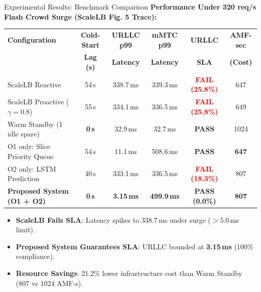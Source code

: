 \documentclass[aspectratio=169,10pt]{beamer}
\begin{document}
\begin{frame}{Experimental Results: Benchmark Comparison}
    \textbf{Performance Under 320 req/s Flash Crowd Surge (ScaleLB Fig. 5 Trace):}
    \vspace{0.2cm}
    
    \begin{table}[H]
    \centering
    \footnotesize
    \begin{tabular}{lccccc}
    \toprule
    \textbf{Configuration} & \textbf{Cold-Start} & \textbf{URLLC p99} & \textbf{mMTC p99} & \textbf{URLLC} & \textbf{AMF-sec} \\
     & \textbf{Lag (s)} & \textbf{Latency} & \textbf{Latency} & \textbf{SLA} & \textbf{(Cost)} \\
    \midrule
    ScaleLB Reactive \cite{scalelb} & 54\,s & 338.7\,ms & 339.3\,ms & \textcolor{red}{\textbf{FAIL (25.8\%)}} & 647 \\
    ScaleLB Proactive ($\gamma=0.8$) & 55\,s & 334.1\,ms & 336.5\,ms & \textcolor{red}{\textbf{FAIL (25.8\%)}} & 649 \\
    Warm Standby (1 idle spare) & \textbf{0\,s} & 32.9\,ms & 32.7\,ms & \textcolor{green!60!black}{\textbf{PASS}} & 1024 \\
    O1 only: Slice Priority Queue & 54\,s & 11.1\,ms & 508.6\,ms & \textcolor{green!60!black}{\textbf{PASS}} & \textbf{647} \\
    O2 only: LSTM Prediction & 40\,s & 333.1\,ms & 336.5\,ms & \textcolor{red}{\textbf{FAIL (18.3\%)}} & 807 \\
    \textbf{Proposed System (O1 + O2)} & \textbf{0\,s} & \textbf{3.15\,ms} & \textbf{499.9\,ms} & \textcolor{green!60!black}{\textbf{PASS (0.0\%)}} & \textbf{807} \\
    \bottomrule
    \end{tabular}
    \end{table}

    \vspace{0.2cm}
    \begin{itemize}
        \item \textbf{ScaleLB Fails SLA}: Latency spikes to 338.7\,ms under surge ($>5.0$\,ms limit).
        \item \textbf{Proposed System Guarantees SLA}: URLLC bounded at \textbf{3.15\,ms} (100\% compliance).
        \item \textbf{Resource Savings}: 21.2\% lower infrastructure cost than Warm Standby (807 vs 1024 AMF-s).
    \end{itemize}
\end{frame}
\end{document}
